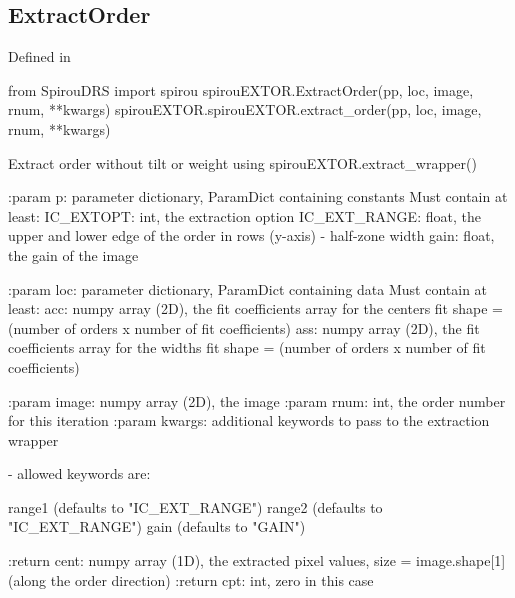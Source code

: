 \begin{minipage}{\textwidth}
\subsection{ExtractOrder}

Defined in \spirouEXTOR{}

\begin{pythonbox}
from SpirouDRS import spirou
spirouEXTOR.ExtractOrder(pp, loc, image, rnum, **kwargs)
spirouEXTOR.spirouEXTOR.extract_order(pp, loc, image, rnum, **kwargs)
\end{pythonbox}

\begin{pythondocstring}
Extract order without tilt or weight using spirouEXTOR.extract_wrapper()

:param p: parameter dictionary, ParamDict containing constants
    Must contain at least:
            IC_EXTOPT: int, the extraction option
            IC_EXT_RANGE: float, the upper and lower edge of the order
                          in rows (y-axis) - half-zone width
            gain: float, the gain of the image

:param loc: parameter dictionary, ParamDict containing data
        Must contain at least:
            acc: numpy array (2D), the fit coefficients array for
                  the centers fit
                  shape = (number of orders x number of fit coefficients)
            ass: numpy array (2D), the fit coefficients array for
                  the widths fit
                  shape = (number of orders x number of fit coefficients)

:param image: numpy array (2D), the image
:param rnum: int, the order number for this iteration
:param kwargs: additional keywords to pass to the extraction wrapper

        - allowed keywords are:

        range1  (defaults to "IC_EXT_RANGE")
        range2  (defaults to "IC_EXT_RANGE")
        gain    (defaults to "GAIN")

:return cent: numpy array (1D), the extracted pixel values,
             size = image.shape[1] (along the order direction)
:return cpt: int, zero in this case
\end{pythondocstring}
\end{minipage}


